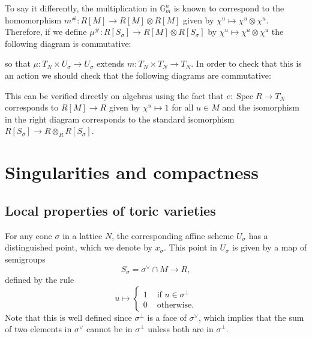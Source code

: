 \documentclass[10pt,a4paper]{book}
\newcommand{\on}{\operatorname}
\newcommand{\s}{\on{Spec}}
\begin{document}
To say it differently, the multiplication in $\mathbb{G}_m^n$ is known to correspond to the homomorphism $m^\# \colon R[M] \to R[M]\otimes R[M]$ given by $\chi^u\mapsto \chi^u\otimes \chi^u$. Therefore, if we define $\mu^\#\colon R[S_\sigma]\to R[M]\otimes R[S_\sigma]$ by $\chi^u\mapsto \chi^u\otimes \chi^u$ the following diagram is commutative:
\begin{center}
\end{center}
so that $\mu\colon T_N\times U_\sigma \to U_\sigma$ extends $m\colon T_N\times T_N \to T_N$. In order to check that this is an action we should check that the following diagrams are commutative:

\begin{center}
 
\end{center}
This can be verified directly on algebras using the fact that $e:\s R \to T_N$ corresponds to $R[M]\to R$ given by $\chi^u\mapsto 1$ for all $u\in M$ and the isomorphism in the right diagram corresponds to the standard isomorphism $R[S_\sigma]\to R\otimes_R R[S_\sigma]$.



\chapter{Singularities and compactness}

\section{Local properties of toric varieties}
For any cone $\sigma$ in a lattice $N$, the corresponding affine scheme $U_\sigma$ has a distinguished point, which we denote by $x_\sigma$. This point in $U_\sigma$ is given by a map of semigroups
\[
S_\sigma = \sigma^\vee \cap M \to R,
\]
defined by the rule
\[
u \mapsto \begin{cases}
1 & \text{ if } u\in \sigma^\perp\\
0 & \text{ otherwise}.
\end{cases}
\]
Note that this is well defined since $\sigma^\perp$ is a face of $\sigma^\vee$, which implies
that the sum of two elements in $\sigma^\vee$ cannot be in $\sigma^\perp$ unless both are in $\sigma^\perp$.
\end{document}
